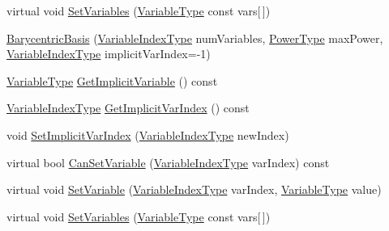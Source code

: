 \begin{DoxyCompactItemize}
\item 
virtual void \hyperlink{classnmr_multi_variable_power_basis_ab454425aeefbf2d7afd741ca6dcb38cb}{Set\+Variables} (\hyperlink{classnmr_multi_variable_power_basis_a7089007a79cce8d2eb3672e2d61af06c}{Variable\+Type} const vars\mbox{[}$\,$\mbox{]})
\item 
\hyperlink{classnmr_multi_variable_power_basis_ae41a070cd143003217f557cb0fce175f}{Barycentric\+Basis} (\hyperlink{classnmr_multi_variable_power_basis_ae125326a623043fcfd020aeeefd1cce6}{Variable\+Index\+Type} num\+Variables, \hyperlink{classnmr_multi_variable_power_basis_a2cb67df83e9fcac213848fa7a7295fcc}{Power\+Type} max\+Power, \hyperlink{classnmr_multi_variable_power_basis_ae125326a623043fcfd020aeeefd1cce6}{Variable\+Index\+Type} implicit\+Var\+Index=-\/1)
\item 
\hyperlink{classnmr_multi_variable_power_basis_a7089007a79cce8d2eb3672e2d61af06c}{Variable\+Type} \hyperlink{classnmr_multi_variable_power_basis_a10bb68fd02aefa61c187151b741a5ae7}{Get\+Implicit\+Variable} () const 
\item 
\hyperlink{classnmr_multi_variable_power_basis_ae125326a623043fcfd020aeeefd1cce6}{Variable\+Index\+Type} \hyperlink{classnmr_multi_variable_power_basis_af19d614590b843a7ce1f4355be4174bd}{Get\+Implicit\+Var\+Index} () const 
\item 
void \hyperlink{classnmr_multi_variable_power_basis_ac08437f297d3deb0d7bbb6500b06779d}{Set\+Implicit\+Var\+Index} (\hyperlink{classnmr_multi_variable_power_basis_ae125326a623043fcfd020aeeefd1cce6}{Variable\+Index\+Type} new\+Index)
\item 
virtual bool \hyperlink{classnmr_multi_variable_power_basis_abcaeac7c3a176d67ff36be3cabd12de1}{Can\+Set\+Variable} (\hyperlink{classnmr_multi_variable_power_basis_ae125326a623043fcfd020aeeefd1cce6}{Variable\+Index\+Type} var\+Index) const 
\item 
virtual void \hyperlink{classnmr_multi_variable_power_basis_a9e01a0a65e51201f44851c34a68fdd59}{Set\+Variable} (\hyperlink{classnmr_multi_variable_power_basis_ae125326a623043fcfd020aeeefd1cce6}{Variable\+Index\+Type} var\+Index, \hyperlink{classnmr_multi_variable_power_basis_a7089007a79cce8d2eb3672e2d61af06c}{Variable\+Type} value)
\item 
virtual void \hyperlink{classnmr_multi_variable_power_basis_ab454425aeefbf2d7afd741ca6dcb38cb}{Set\+Variables} (\hyperlink{classnmr_multi_variable_power_basis_a7089007a79cce8d2eb3672e2d61af06c}{Variable\+Type} const vars\mbox{[}$\,$\mbox{]})
\end{DoxyCompactItemize}

